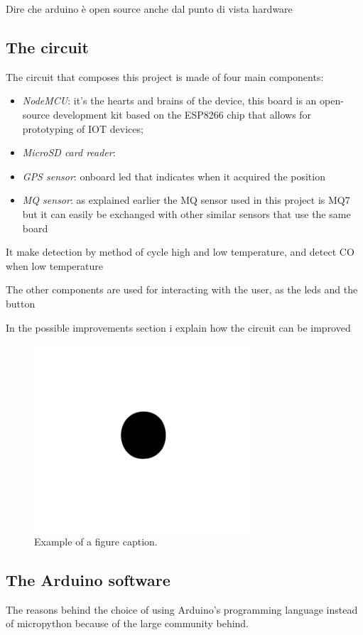 \documentclass[conference]{IEEEtran}
\begin{document}
	Dire che arduino è open source anche dal punto di vista hardware
	
	\subsection{The circuit}\label{AA}
		The circuit that composes this project is made of four main components:
		\begin{itemize}
			\item \textit{NodeMCU}: it's the hearts and brains of the device, this board is an open-source development kit based on the ESP8266 chip that allows for prototyping of IOT devices;
			\item \textit{MicroSD card reader}: 
			\item \textit{GPS sensor}: onboard led that indicates when it acquired the position
			\item \textit{MQ sensor}: as explained earlier the MQ sensor used in this project is MQ7 but it can easily be exchanged with other similar sensors that use the same board
		\end{itemize}
	
		It make detection by method of cycle high and low temperature, and detect CO when low temperature \cite{mq7}
	
		The other components are used for interacting with the user, as the leds and the button
		
		In the possible improvements section i explain how the circuit can be improved 
	
	\begin{figure}[htbp]
		\centerline{\includegraphics[width=8cm]{fig1.png}}
		\caption{Example of a figure caption.}
		\label{fig}
	\end{figure}


\subsection{The Arduino software}
The reasons behind the choice of using Arduino's programming language instead of micropython \cite{micropyhton} because of the large community behind.
\end{document}
